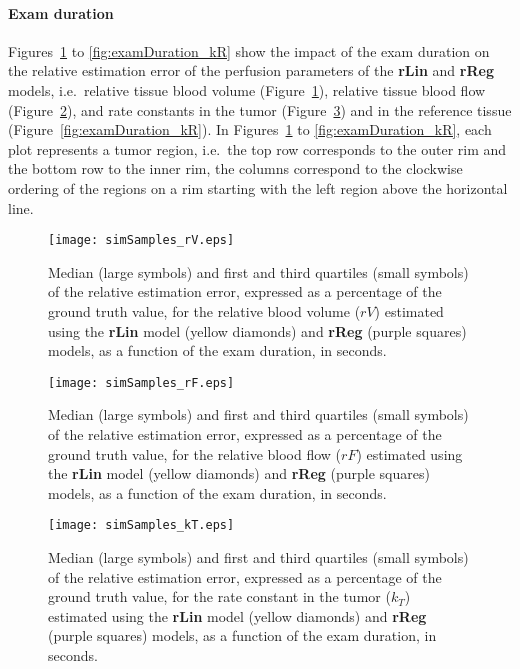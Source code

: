 \paragraph{Exam duration}
Figures~\ref{fig:examDuration_rV} to \ref{fig:examDuration_kR} show the impact of the exam duration on the relative estimation error of the perfusion parameters of the \textbf{rLin} and \textbf{rReg} models, i.e.~relative tissue blood volume (Figure~\ref{fig:examDuration_rV}), relative tissue blood flow (Figure~\ref{fig:examDuration_rF}), and rate constants in the tumor (Figure~\ref{fig:examDuration_kT}) and in the reference tissue (Figure~\ref{fig:examDuration_kR}).
In Figures~\ref{fig:examDuration_rV} to \ref{fig:examDuration_kR}, each plot represents a tumor region, i.e.~the top row corresponds to the outer rim and the bottom row to the inner rim, the columns correspond to the clockwise ordering of the regions on a rim starting with the left region above the horizontal line.

\begin{figure}
\texttt{[image: simSamples\_rV.eps]}
\caption{Median (large symbols) and first and third quartiles (small symbols) of the relative estimation error, expressed as a percentage of the ground truth value, for the relative blood volume ($rV$) estimated using the \textbf{rLin} model (yellow diamonds) and \textbf{rReg} (purple squares) models, as a function of the exam duration, in seconds.}
\label{fig:examDuration_rV}
\end{figure}

\begin{figure}
\texttt{[image: simSamples\_rF.eps]}
\caption{Median (large symbols) and first and third quartiles (small symbols) of the relative estimation error, expressed as a percentage of the ground truth value, for the relative blood flow ($rF$) estimated using the \textbf{rLin} model (yellow diamonds) and \textbf{rReg} (purple squares) models, as a function of the exam duration, in seconds.}
\label{fig:examDuration_rF}
\end{figure}

\begin{figure}
\texttt{[image: simSamples\_kT.eps]}
\caption{Median (large symbols) and first and third quartiles (small symbols) of the relative estimation error, expressed as a percentage of the ground truth value, for the rate constant in the tumor ($k_T$) estimated using the \textbf{rLin} model (yellow diamonds) and \textbf{rReg} (purple squares) models, as a function of the exam duration, in seconds.}
\label{fig:examDuration_kT}
\end{figure}

